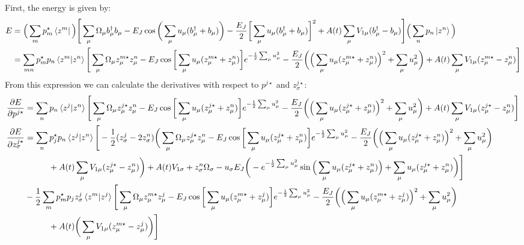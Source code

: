\documentclass[prb]{revtex4}
\newcommand{\eq}[1]{\begin{align}#1\end{align}}
\begin{document}
First, the energy is given by:
\eq{	
E &= \Big(  \sum_{m} p_{m}^\star \bra{z^{m}}\Big) \Bigg[ \sum_\mu \Omega_\mu b_\mu^\dag b_\mu  - E_J \cos\bigg( \sum_\mu u_\mu (b_\mu^\dag + b_\mu)  \bigg) - \frac{E_J}{2} \bigg[ \sum_\mu u_\mu (b_\mu^\dag + b_\mu) \bigg]^2 + A(t) \sum_\mu V_{1\mu} (b_\mu^\dag - b_\mu) \Bigg] \Big(  \sum_{n} p_{n} \ket{z^{n}}\Big)  \notag \\
&= \sum_{mn} p_m^\star p_n \braket{z^m|z^n}\Bigg[ \sum_\mu  \Omega_\mu z_\mu^{m\star}z_\mu^{n}- E_J \cos\bigg[ \sum_\mu u_\mu (z_\mu^{m\star}+z_\mu^{n}) \bigg]e^{-\frac{1}{2}\sum_\mu u_\mu^2} -\frac{E_J}{2} \bigg(  \Big(\sum_\mu u_\mu (z_\mu^{m\star} + z_\mu^n)\Big)^2 +\sum_\mu u_\mu^2 \bigg) + A(t) \sum_\mu V_{1\mu} (z_\mu^{m\star} - z_\mu^n) \Bigg]
}
%
From this expression we can calculate the derivatives with respect to $p^{j\star}$ and $z_\sigma^{j\star}$:
\eq{
\frac{\partial E}{\partial p^{j\star}} &=  \sum_{n} p_n \braket{z^j|z^n}\Bigg[ \sum_\mu  \Omega_\mu z_\mu^{j\star}z_\mu^{n}- E_J \cos\bigg[ \sum_\mu u_\mu (z_\mu^{j\star}+z_\mu^{n}) \bigg]e^{-\frac{1}{2}\sum_\mu u_\mu^2} -\frac{E_J}{2} \bigg(  \Big(\sum_\mu u_\mu (z_\mu^{j\star} + z_\mu^n)\Big)^2 +\sum_\mu u_\mu^2 \bigg)+ A(t) \sum_\mu V_{1\mu} (z_\mu^{j\star} - z_\mu^n) \Bigg] \notag \\
%
\frac{\partial E}{\partial z_\sigma^{j\star}} &=\sum_{n} p_j^\star p_n  \braket{z^j|z^n}\Bigg[ -\frac{1}{2}(z_\sigma^j-2 z_\sigma^n)\bigg(\sum_\mu  \Omega_\mu z_\mu^{j\star}z_\mu^{n}- E_J \cos \bigg[ \sum_\mu u_\mu (z_\mu^{j\star}+z_\mu^{n}) \bigg] e^{-\frac{1}{2}\sum_\mu u_\mu^2} -\frac{E_J}{2} \bigg(  \Big(\sum_\mu u_\mu (z_\mu^{j\star} + z_\mu^n)\Big)^2 +\sum_\mu u_\mu^2 \bigg) \notag \\
&\hspace{1cm}+ A(t)  \sum_\mu V_{1\mu} (z_\mu^{j\star} - z_\mu^n)\bigg) +  A(t) V_{1\sigma}  + z_\sigma^n\Omega_\sigma - u_\sigma E_J \bigg( -e^{-\frac{1}{2}\sum_\mu u_\mu^2} \sin\Big( \sum_\mu u_\mu (z_\mu^{j\star} + z_\mu^n)\Big) +\sum_\mu u_\mu(z_\mu^{j\star} +z_\mu^n)  \bigg) \Bigg]  \notag \\ 
& -\frac{1}{2}\sum_{m}  p_m^\star p_j  z_\sigma^j  \braket{z^m|z^j}\Bigg[ \sum_\mu  \Omega_\mu z_\mu^{m\star}z_\mu^{j}- E_J \cos \bigg[ \sum_\mu u_\mu (z_\mu^{m\star}+z_\mu^{j}) \bigg] e^{-\frac{1}{2}\sum_\mu u_\mu^2} -\frac{E_J}{2} \bigg(  \Big(\sum_\mu u_\mu (z_\mu^{m\star} + z_\mu^j)\Big)^2 +\sum_\mu u_\mu^2 \bigg) \notag \\
&\hspace{1cm}+ A(t) \bigg( \sum_\mu V_{1\mu} (z_\mu^{m\star} - z_\mu^j)\bigg) \Bigg] 
}
\end{document}
